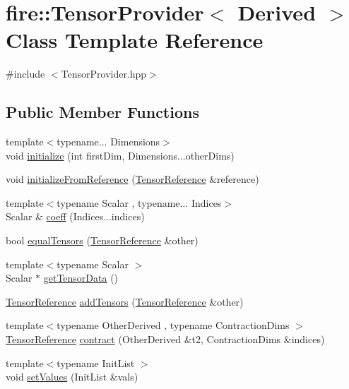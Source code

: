 \hypertarget{a00047}{}\section{fire\+:\+:Tensor\+Provider$<$ Derived $>$ Class Template Reference}
\label{a00047}


{\ttfamily \#include $<$Tensor\+Provider.\+hpp$>$}

\subsection*{Public Member Functions}
\begin{DoxyCompactItemize}
\item 
{\footnotesize template$<$typename... Dimensions$>$ }\\void \hyperlink{a00047_a7ad248537003c317ab3f4d319b4707ff}{initialize} (int first\+Dim, Dimensions...\+other\+Dims)
\item 
void \hyperlink{a00047_a9675616f1a084937cc4af24660faf40f}{initialize\+From\+Reference} (\hyperlink{a00103_a744d7805ef98562de55f32012ab11cfb}{Tensor\+Reference} \&reference)
\item 
{\footnotesize template$<$typename Scalar , typename... Indices$>$ }\\Scalar \& \hyperlink{a00047_ad43be8da16d458ef4753c2a7e82e8ed1}{coeff} (Indices...\+indices)
\item 
bool \hyperlink{a00047_a94350ed39bfd9b1a7bc68495dfc959b5}{equal\+Tensors} (\hyperlink{a00103_a744d7805ef98562de55f32012ab11cfb}{Tensor\+Reference} \&other)
\item 
{\footnotesize template$<$typename Scalar $>$ }\\Scalar $\ast$ \hyperlink{a00047_a2a2de14154f8e814c813ec9b2ad60dfa}{get\+Tensor\+Data} ()
\item 
\hyperlink{a00103_a744d7805ef98562de55f32012ab11cfb}{Tensor\+Reference} \hyperlink{a00047_ab488a19a67d0a9f7c68ddbf760c925fe}{add\+Tensors} (\hyperlink{a00103_a744d7805ef98562de55f32012ab11cfb}{Tensor\+Reference} \&other)
\item 
{\footnotesize template$<$typename Other\+Derived , typename Contraction\+Dims $>$ }\\\hyperlink{a00103_a744d7805ef98562de55f32012ab11cfb}{Tensor\+Reference} \hyperlink{a00047_a511051f49f8aab0997ab137ec199e147}{contract} (Other\+Derived \&t2, Contraction\+Dims \&indices)
\item 
{\footnotesize template$<$typename Init\+List $>$ }\\void \hyperlink{a00047_a675e6eb96bc0081dd83b3d637085effe}{set\+Values} (Init\+List \&vals)

\end{DoxyCompactItemize}
